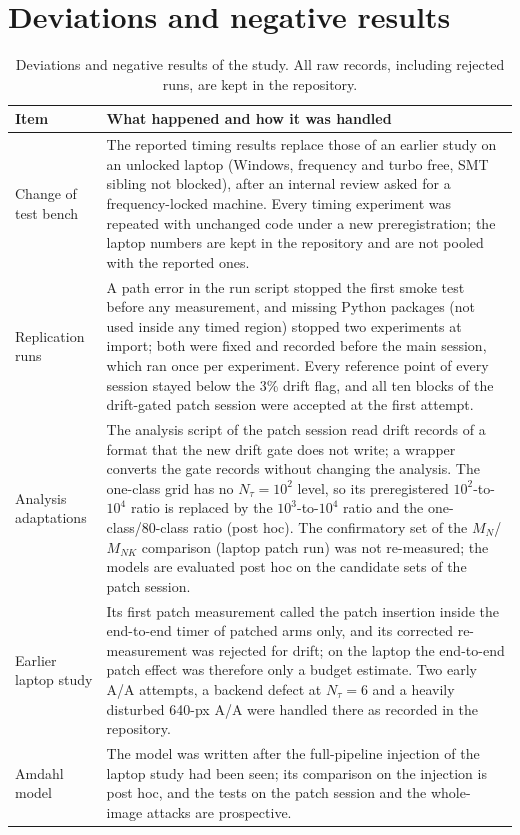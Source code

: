 \documentclass[a4paper,fleqn]{cas-dc}
\newcommand{\Ntau}{N_{\tau}}
\begin{document}
\section{Deviations and negative results}
\label{app:dev}
\begin{table}[pos=!t]
\centering\small
\caption{Deviations and negative results of the study. All raw records, including rejected runs, are kept in the repository.}
\label{tab:dev}
\begin{tabularx}{\textwidth}{@{}p{3.3cm}X@{}}
\toprule
Item & What happened and how it was handled \\
\midrule
Change of test bench & The reported timing results replace those of an earlier study on an unlocked laptop (Windows, frequency and turbo free, SMT sibling not blocked), after an internal review asked for a frequency-locked machine. Every timing experiment was repeated with unchanged code under a new preregistration; the laptop numbers are kept in the repository and are not pooled with the reported ones. \\
Replication runs & A path error in the run script stopped the first smoke test before any measurement, and missing Python packages (not used inside any timed region) stopped two experiments at import; both were fixed and recorded before the main session, which ran once per experiment. Every reference point of every session stayed below the 3\% drift flag, and all ten blocks of the drift-gated patch session were accepted at the first attempt. \\
Analysis adaptations & The analysis script of the patch session read drift records of a format that the new drift gate does not write; a wrapper converts the gate records without changing the analysis. The one-class grid has no $\Ntau=10^2$ level, so its preregistered $10^2$-to-$10^4$ ratio is replaced by the $10^3$-to-$10^4$ ratio and the one-class/80-class ratio (post hoc). The confirmatory set of the $M_N$/$M_{NK}$ comparison (laptop patch run) was not re-measured; the models are evaluated post hoc on the candidate sets of the patch session. \\
Earlier laptop study & Its first patch measurement called the patch insertion inside the end-to-end timer of patched arms only, and its corrected re-measurement was rejected for drift; on the laptop the end-to-end patch effect was therefore only a budget estimate. Two early A/A attempts, a backend defect at $\Ntau=6$ and a heavily disturbed 640-px A/A were handled there as recorded in the repository. \\
Amdahl model & The model was written after the full-pipeline injection of the laptop study had been seen; its comparison on the injection is post hoc, and the tests on the patch session and the whole-image attacks are prospective. \\
\bottomrule
\end{tabularx}
\end{table}

\FloatBarrier


\end{document}

